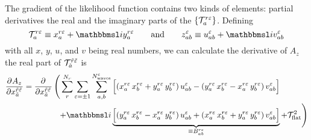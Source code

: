 The gradient of the likelihood function contains two kinds of
elements: partial derivatives \wrt the real and the imaginary parts of
the $\cBrk{\mathcal{T}_a^{r \refl}}$. Defining
\begin{equation}
  \mathcal{T}_a^{r \refl} \equiv x_a^{r \refl} + \i y_a^{r \refl}
  \qquad\text{and}\qquad
  z^\refl_{a b} \equiv u^\refl_{a b} + \i v^\refl_{a b}
\end{equation}
with all $x$, $y$, $u$, and $v$ being real numbers, we can calculate
the derivative of $A_z$ \wrt the real part of
$\mathcal{T}_{\tilde{a}}^{\tilde{r} \tilde{\varepsilon}}$ is
\begin{equation}
  \label{eq:likelihood_function_sum_term_re_deriv_start}
  \begin{split}
    \dpd{A_z}{{x_{\tilde{a}}^{\tilde{r} \tilde{\refl}}}}
    = \dpd{}{{x_{\tilde{a}}^{\tilde{r} \tilde{\refl}}}}
    \Bigg( \sum_r^{N_r} \sum_{\refl = \pm 1} \sum_{a, b}^{N^\refl_\text{waves}}
      &\sBrk[2]{(x_a^{r \refl}\, x_b^{r \refl} + y_a^{r \refl}\, y_b^{r \refl})\, u^\refl_{a b}
        - (y_a^{r \refl}\, x_b^{r \refl} - x_a^{r \refl}\, y_b^{r \refl})\, v^\refl_{a b}} \\
      + \i &\underbrace{\sBrk[2]{(y_a^{r \refl}\, x_b^{r \refl} - x_a^{r \refl}\, y_b^{r \refl})\, u^\refl_{a b}
        + (x_a^{r \refl}\, x_b^{r \refl} + y_a^{r \refl}\, y_b^{r \refl})\, v^\refl_{a b}}}_{\equiv B^{r \refl}_{a b}}
      + \mathcal{T}_\text{flat}^2 \Bigg)
  \end{split}
\end{equation}
